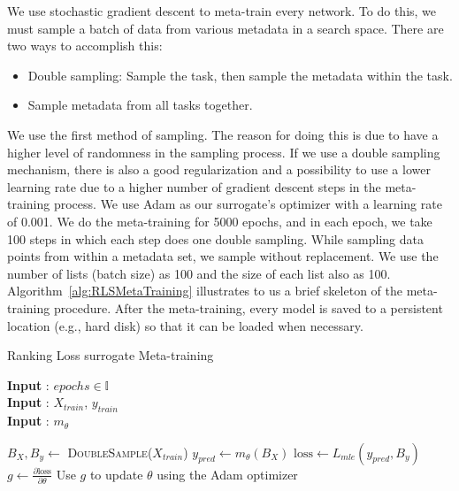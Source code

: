 \documentclass[12pt, twoside, ngerman]{report}
\begin{document}
We use stochastic gradient descent to meta-train every network.
To do this, we must sample a batch of data from various metadata in a search space.
There are two ways to accomplish this:
\begin{itemize}
\item Double sampling: Sample the task, then sample the metadata within the task.
\item Sample metadata from all tasks together.
\end{itemize}

We use the first method of sampling.
The reason for doing this is due to have a higher level of randomness in the sampling process. If we use a double sampling mechanism, there is also a good regularization and a possibility to use a lower learning rate due to a higher number of gradient descent steps in the meta-training process.
We use Adam as our surrogate's optimizer with a learning rate of 0.001.
We do the meta-training for 5000 epochs, and in each epoch, we take 100 steps in which each step does one double sampling.
While sampling data points from within a metadata set, we sample without replacement.
We use the number of lists (batch size) as 100 and the size of each list also as 100.
Algorithm~\ref{alg:RLSMetaTraining} illustrates to us a brief skeleton of the meta-training procedure.
After the meta-training, every model is saved to a persistent location (e.g., hard disk) so that it can be loaded when necessary.

\begin{algorithm}[h]
\caption{Ranking Loss surrogate Meta-training}
\label{alg:RLSMetaTraining}
\hspace*{\algorithmicindent} \textbf{Input} : $epochs \in \mathbb{I}$ \\
 \hspace*{\algorithmicindent} \textbf{Input} : $X_{train}$,  $y_{train}$   \\
\hspace*{\algorithmicindent} \textbf{Input} : $m_{\theta}$ 
\begin{algorithmic}[1]
                \State $B_{X}, B_{y} \gets$ \textsc{DoubleSample}($X_{train}$) 
                \State $y_{pred} \gets m_{\theta}(B_{X})$
                \State $\textrm{loss} \gets L_{mle}(y_{pred},  B_{y}) $
                \State $g \gets \frac{\partial \textrm{loss}}{\partial \theta}$ 
                \State Use $g$ to update $\theta$ using the Adam optimizer
    \EndFor
\EndProcedure
\end{algorithmic}
\end{algorithm}
\end{document}
